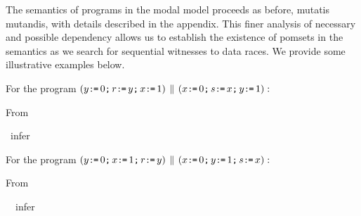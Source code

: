 The semantics of programs in the modal model proceeds as before, mutatis mutandis, with details described in the appendix.  This finer analysis of necessary and possible dependency allows us to establish the existence of pomsets in the semantics as we search for sequential witnesses to data races.    We provide some illustrative examples below.


For the program
\begin{math}
(y\texttt{:}\mkern-1mu\texttt{=}\, 0 \texttt{;}\, r \texttt{:}\mkern-1mu\texttt{=}\, y  \texttt{;}\, x \texttt{:}\mkern-1mu\texttt{=}\, 1) \,\mathbin{\|}\,
(x\texttt{:}\mkern-1mu\texttt{=}\, 0 \texttt{;}\, s \texttt{:}\mkern-1mu\texttt{=}\, x \texttt{;}\, y \texttt{:}\mkern-1mu\texttt{=}\, 1):
\end{math}
\begin{displaymathsmall}
\mbox{From    }
\qquad\qquad
\begin{tikzcenter}[node distance=1em]
\end{tikzcenter}
\qquad
\mbox{  infer  }
\qquad
\begin{tikzcenter}[node distance=1em]
\end{tikzcenter}
\end{displaymathsmall}
For the program
\begin{math}
  (y\texttt{:}\mkern-1mu\texttt{=}\, 0 \texttt{;}\,   x \texttt{:}\mkern-1mu\texttt{=}\, 1  \texttt{;}\, r \texttt{:}\mkern-1mu\texttt{=}\, y)
  \,\mathbin{\|}\,
  (x\texttt{:}\mkern-1mu\texttt{=}\, 0 \texttt{;}\,  y \texttt{:}\mkern-1mu\texttt{=}\, 1  \texttt{;}\,  s \texttt{:}\mkern-1mu\texttt{=}\, x):
\end{math}
\begin{displaymathsmall}
\mbox{From  }
\qquad \qquad
\begin{tikzcenter}[node distance=1em]
\end{tikzcenter}
\qquad
\ \mbox{ infer }
\qquad
\begin{tikzcenter}[node distance=1em]
\end{tikzcenter}
\end{displaymathsmall}
